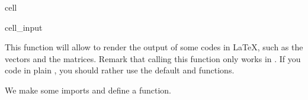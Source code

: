 \documentclass[letterpaper,10pt,english]{jupyterBook}
\begin{document}
\begin{sphinxuseclass}{cell}\begin{sphinxVerbatimInput}

\begin{sphinxuseclass}{cell_input}
\begin{sphinxVerbatim}[commandchars=\\\{\}]
\end{sphinxVerbatim}

\end{sphinxuseclass}\end{sphinxVerbatimInput}

\end{sphinxuseclass}
\begin{sphinxShadowBox}
\sphinxstylesidebartitle{}

\sphinxAtStartPar
This  function will allow to render the output of some codes in LaTeX, such as the vectors and the matrices. Remark that calling this function only works in . If you code in plain , you should rather use the default  and  functions.
\end{sphinxShadowBox}

\sphinxAtStartPar
We make some imports and define a  function.
\end{document}
